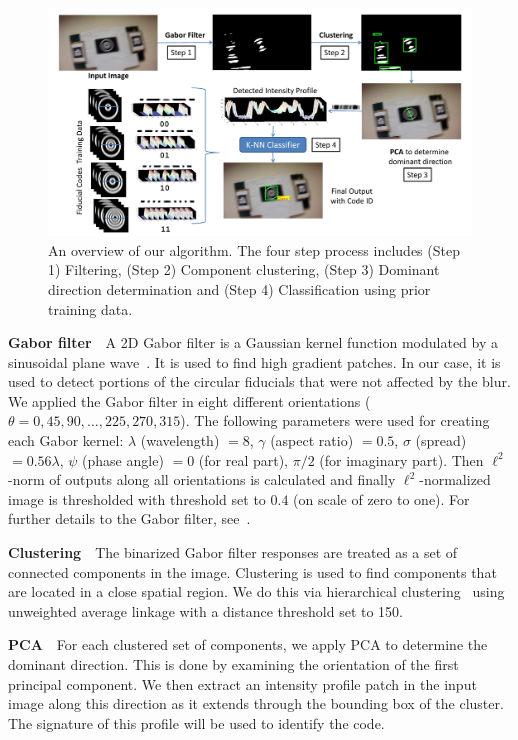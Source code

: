 \documentclass[10pt,twocolumn,letterpaper]{article}
\begin{document}
\begin{figure}[ht!]
  \centering
  \includegraphics[width=0.8\linewidth]{images/overall_flow.pdf}
  \caption{An overview of our algorithm.
    The four step process includes (Step 1) Filtering,
    (Step 2) Component clustering, (Step 3) Dominant direction determination
    and (Step 4) Classification using prior training data.}
  \label{fig:overall_flow}
\end{figure}

\textbf{Gabor filter}~~A 2D Gabor filter is a Gaussian kernel function
modulated by a sinusoidal plane wave~\cite{Kruizinga:2002}. It is used to find
high gradient patches. In our case, it is used to detect portions
of the circular fiducials that were not affected by the blur.
We applied the Gabor filter in eight
different orientations ($\theta = 0, 45, 90, \ldots, 225, 270, 315$).  The
following parameters were used for creating each Gabor kernel: $\lambda$ (wavelength) $= 8$, $\gamma$
(aspect ratio) $= 0.5$, $\sigma$ (spread) $= 0.56\lambda$, $\psi$
(phase angle) $= 0$ (for real part), $\pi/2$ (for imaginary part).
Then $\ell^2$-norm of outputs along all orientations is calculated and finally
$\ell^2$-normalized image is thresholded with threshold set to $0.4$ (on scale of zero to
one).  For further details to the Gabor filter, see~\cite{Kruizinga:2002}.

\textbf{Clustering}~~The binarized Gabor filter responses are
treated as a set of connected components in the image.   Clustering
is used to find components that are located in a close spatial region.  We do
this via hierarchical clustering~\cite{ALGLIB} using unweighted
average linkage with a distance threshold set to 150.

\textbf{PCA}~~For each clustered set of components, we apply
PCA to determine the dominant direction.  This is done by examining
the orientation of the first principal component.  We then extract an
intensity profile patch in the input image along this direction as it
extends through the bounding box of the cluster. The signature of this
profile will be used to identify the code.
\end{document}
